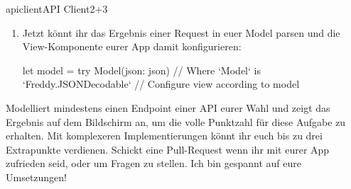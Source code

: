 \documentclass[parskip=half, final]{scrreprt}
\begin{document}
\begin{lecture}
\begin{exc}
\begin{excitem}{apiclient}{API Client}{2+3}
\begin{enumerate}[label=\arabic*.]
\item Jetzt könnt ihr das Ergebnis einer Request in euer Model parsen und die View-Komponente eurer App damit konfigurieren:
\begin{swiftcode}
let model = try Model(json: json) // Where `Model` is `Freddy.JSONDecodable`
// Configure view according to model
\end{swiftcode}

\end{enumerate}

Modelliert mindestens einen Endpoint einer API eurer Wahl und zeigt das Ergebnis auf dem Bildschirm an, um die volle Punktzahl für diese Aufgabe zu erhalten. Mit komplexeren Implementierungen könnt ihr euch bis zu drei Extrapunkte verdienen. Schickt eine Pull-Request wenn ihr mit eurer App zufrieden seid, oder um Fragen zu stellen. Ich bin gespannt auf eure Umsetzungen!

\end{excitem}


\end{exc}



\end{lecture}
\end{document}
